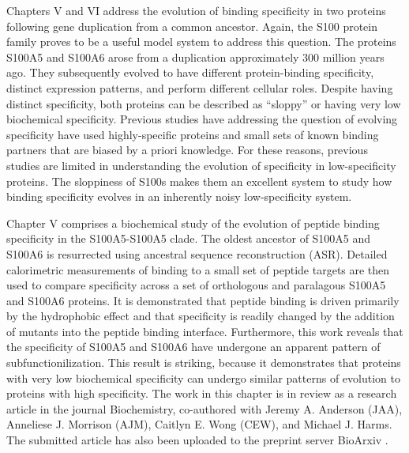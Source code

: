 Chapters V and VI address the evolution of binding specificity in
two proteins following gene duplication from a common ancestor. Again,
the S100 protein family proves to be a useful model system to address
this question. The proteins S100A5 and S100A6 arose from a duplication
approximately 300 million years ago. They subsequently evolved to
have different protein-binding specificity, distinct expression patterns,
and perform different cellular roles. Despite having distinct specificity,
both proteins can be described as “sloppy” or having very low biochemical
specificity. Previous studies have addressing the question of evolving
specificity have used highly-specific proteins and small sets of known
binding partners that are biased by a priori knowledge. For these
reasons, previous studies are limited in understanding the evolution
of specificity in low-specificity proteins. The sloppiness of S100s
makes them an excellent system to study how binding specificity evolves
in an inherently noisy low-specificity system. 

Chapter V comprises a biochemical study of the evolution of peptide
binding specificity in the S100A5-S100A5 clade. The oldest ancestor
of S100A5 and S100A6 is resurrected using ancestral sequence reconstruction
(ASR). Detailed calorimetric measurements of binding to a small set
of peptide targets are then used to compare specificity across a set
of orthologous and paralagous S100A5 and S100A6 proteins. It is demonstrated
that peptide binding is driven primarily by the hydrophobic effect
and that specificity is readily changed by the addition of mutants
into the peptide binding interface. Furthermore, this work reveals
that the specificity of S100A5 and S100A6 have undergone an apparent
pattern of subfunctionilization. This result is striking, because
it demonstrates that proteins with very low biochemical specificity
can undergo similar patterns of evolution to proteins with high specificity.
The work in this chapter is in review as a research article
in the journal Biochemistry, co-authored with Jeremy A. Anderson (JAA),
Anneliese J. Morrison (AJM), Caitlyn E. Wong (CEW), and Michael J.
Harms. The submitted article has also been uploaded to the preprint
server BioArxiv \citep{wheeler_conservation_2017}. 

